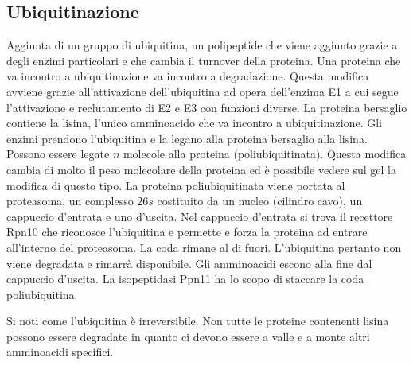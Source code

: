 	\subsection{Ubiquitinazione}
	Aggiunta di un gruppo di ubiquitina, un polipeptide che viene aggiunto grazie a degli enzimi particolari e che cambia il turnover della proteina. 
Una proteina che va incontro a 
	ubiquitinazione va incontro a degradazione. 
Questa modifica avviene grazie all'attivazione dell'ubiquitina ad opera dell'enzima E1 a cui segue l'attivazione e reclutamento di E2 e E3 con
	funzioni diverse. 
La proteina bersaglio contiene la lisina, l'unico amminoacido che va incontro a ubiquitinazione. 
Gli enzimi prendono l'ubiquitina e la legano alla proteina bersaglio
	alla lisina. 
Possono essere legate $n$ molecole alla proteina (poliubiquitinata). 
Questa modifica cambia di molto il peso molecolare della proteina ed \`e possibile vedere sul gel la
	modifica di questo tipo. 
La proteina poliubiquitinata viene portata al proteasoma, un complesso $26s$ costituito da un nucleo (cilindro cavo), un cappuccio d'entrata e uno d'uscita. 
Nel
	cappuccio d'entrata si trova il recettore Rpn10 che riconosce l'ubiquitina e permette e forza la proteina ad entrare all'interno del proteasoma. 
La coda rimane al di fuori. 
L'ubiquitina 
	pertanto non viene degradata e rimarr\`a disponibile. 
Gli amminoacidi escono alla fine dal cappuccio d'uscita. 
La isopeptidasi Ppn11 ha lo scopo di staccare la coda poliubiquitina. 

	Si noti come l'ubiquitina \`e irreversibile. 
Non tutte le proteine contenenti lisina possono essere degradate in quanto ci devono essere a valle e a monte altri amminoacidi specifici. 


